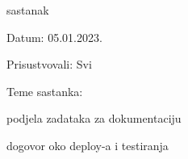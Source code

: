 \begin{packed_enum}
            \item sastanak
        
        \item[] \begin{packed_item}
				\item Datum: 05.01.2023.
				\item Prisustvovali: Svi
				\item Teme sastanka:
				\begin{packed_item}
					\item  podjela zadataka za dokumentaciju
					\item  dogovor oko deploy-a i testiranja
				\end{packed_item}
			\end{packed_item}
   
    \end{packed_enum}
    \eject

